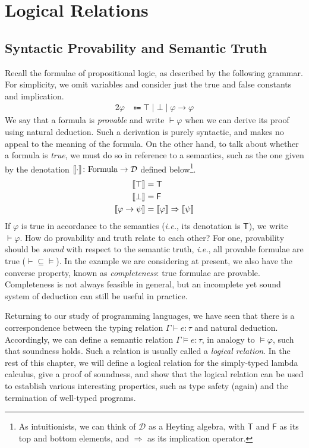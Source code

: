 \chapter{Logical Relations}

\section{Syntactic Provability and Semantic Truth}

Recall the formulae of propositional logic, as described by the following
grammar. For simplicity, we omit variables and consider just the true
and false constants and implication.
\begin{alignat*}{2}
  \varphi & \Coloneqq \top \mid \bot \mid \varphi \to \varphi
\end{alignat*}
We say that a formula is \emph{provable} and write $\vdash \varphi$
when we can derive its proof using natural deduction. Such a derivation
is purely syntactic, and makes no appeal to the meaning of the formula.
On the other hand, to talk about whether a formula is \emph{true},
we must do so in reference to a semantics, such as the one given by the
denotation
$\llbracket\cdot\rrbracket \colon \mathrm{Formula} \to \mathcal{D}$
defined below\footnote{
  As intuitionists, we can think of $\mathcal{D}$ as a Heyting algebra,
  with $\mathsf{T}$ and $\mathsf{F}$ as its top and bottom elements, and
  $\Rightarrow$ as its implication operator.
}.
\begin{alignat*}{2}
  \llbracket\top\rrbracket & = \mathsf{T} \\
  \llbracket\bot\rrbracket & = \mathsf{F} \\
  \llbracket\varphi \to \psi\rrbracket & = \llbracket\varphi\rrbracket \Rightarrow \llbracket\psi\rrbracket
\end{alignat*}
If $\varphi$ is true in accordance to the semantics
(\emph{i.e.}, its denotation is $\mathsf{T}$),
we write $\models \varphi$. How do
provability and truth relate to each other? For one, provability should be
\emph{sound} with respect to the semantic truth, \emph{i.e.}, all provable
formulae are true (${\vdash} \subseteq {\models}$).
In the example we are considering at present, we also have the
converse property, known as \emph{completeness}: true formulae are provable.
Completeness is not always feasible in general, but an incomplete
yet sound system of deduction can still be useful in practice.

Returning to our study of programming languages, we have seen that there is a
correspondence between the typing relation $\Gamma \vdash e : \tau$ and natural
deduction.
Accordingly, we can define a semantic relation $\Gamma \models e : \tau$, in
analogy to $\models \varphi$, such that soundness holds.
Such a relation is usually called a \emph{logical relation}. In the rest of
this chapter, we will define a logical relation for the simply-typed lambda
calculus, give a proof of soundness, and show that the logical relation can be
used to establish various interesting properties, such as type safety (again)
and the termination of well-typed programs.

